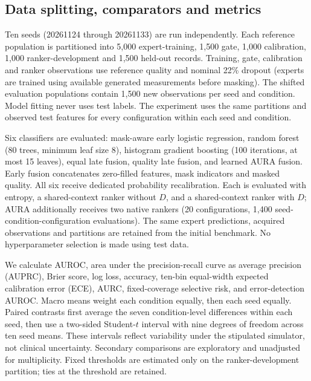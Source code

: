\documentclass[conference]{IEEEtran}
\begin{document}
\subsection{Data splitting, comparators and metrics}
Ten seeds (20261124 through 20261133) are run independently. Each reference population is partitioned into 5,000 expert-training, 1,500 gate, 1,000 calibration, 1,000 ranker-development and 1,500 held-out records. Training, gate, calibration and ranker observations use reference quality and nominal 22\% dropout (experts are trained using available generated measurements before masking). The shifted evaluation populations contain 1,500 new observations per seed and condition. Model fitting never uses test labels. The experiment uses the same partitions and observed test features for every configuration within each seed and condition.

Six classifiers are evaluated: mask-aware early logistic regression, random forest (80 trees, minimum leaf size 8), histogram gradient boosting (100 iterations, at most 15 leaves), equal late fusion, quality late fusion, and learned AURA fusion. Early fusion concatenates zero-filled features, mask indicators and masked quality. All six receive dedicated probability recalibration. Each is evaluated with entropy, a shared-context ranker without $D$, and a shared-context ranker with $D$; AURA additionally receives two native rankers (20 configurations, 1,400 seed-condition-configuration evaluations). The same expert predictions, acquired observations and partitions are retained from the initial benchmark. No hyperparameter selection is made using test data.

We calculate AUROC, area under the precision-recall curve as average precision (AUPRC), Brier score, log loss, accuracy, ten-bin equal-width expected calibration error (ECE), AURC, fixed-coverage selective risk, and error-detection AUROC. Macro means weight each condition equally, then each seed equally. Paired contrasts first average the seven condition-level differences within each seed, then use a two-sided Student-$t$ interval with nine degrees of freedom across ten seed means. These intervals reflect variability under the stipulated simulator, not clinical uncertainty. Secondary comparisons are exploratory and unadjusted for multiplicity. Fixed thresholds are estimated only on the ranker-development partition; ties at the threshold are retained.
\end{document}

